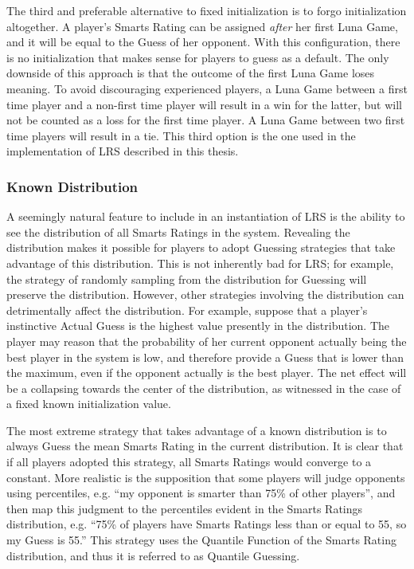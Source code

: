 The third and preferable alternative to fixed initialization is to forgo initialization altogether. A player's Smarts Rating can be assigned \textit{after} her first Luna Game, and it will be equal to the Guess of her opponent. With this configuration, there is no initialization that makes sense for players to guess as a default. The only downside of this approach is that the outcome of the first Luna Game loses meaning. To avoid discouraging experienced players, a Luna Game between a first time player and a non-first time player will result in a win for the latter, but will not be counted as a loss for the first time player. A Luna Game between two first time players will result in a tie. This third option is the one used in the implementation of LRS described in this thesis.

\subsubsection{Known Distribution}

A seemingly natural feature to include in an instantiation of LRS is the ability to see the distribution of all Smarts Ratings in the system. Revealing the distribution makes it possible for players to adopt Guessing strategies that take advantage of this distribution. This is not inherently bad for LRS; for example, the strategy of randomly sampling from the distribution for Guessing will preserve the distribution. However, other strategies involving the distribution can detrimentally affect the distribution. For example, suppose that a player's instinctive Actual Guess is the highest value presently in the distribution. The player may reason that the probability of her current opponent actually being the best player in the system is low, and therefore provide a Guess that is lower than the maximum, even if the opponent actually is the best player. The net effect will be a collapsing towards the center of the distribution, as witnessed in the case of a fixed known initialization value.

The most extreme strategy that takes advantage of a known distribution is to always Guess the mean Smarts Rating in the current distribution. It is clear that if all players adopted this strategy, all Smarts Ratings would converge to a constant. More realistic is the supposition that some players will judge opponents using percentiles, e.g. ``my opponent is smarter than 75\% of other players'', and then map this judgment to the percentiles evident in the Smarts Ratings distribution, e.g. ``75\% of players have Smarts Ratings less than or equal to 55, so my Guess is 55.'' This strategy uses the Quantile Function of the Smarts Rating distribution, and thus it is referred to as Quantile Guessing.

